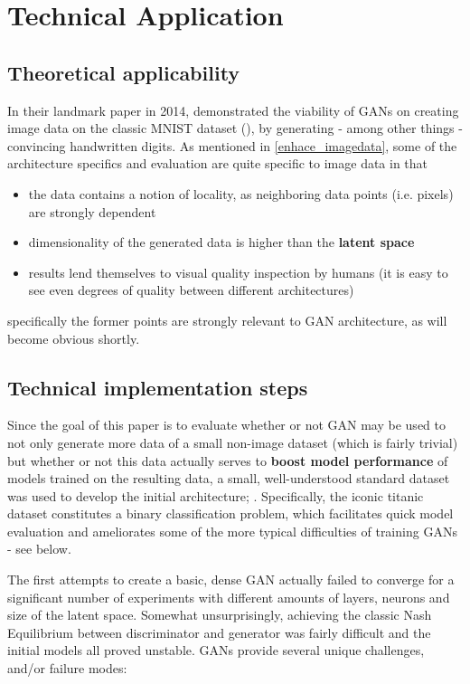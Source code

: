 \chapter{Technical Application}

\section{Theoretical applicability}

In their landmark paper in 2014, \cite{goodfellow2014generative} demonstrated the viability of \acp{GAN} on creating image data on the classic MNIST dataset (\cite{mnist}), by generating - among other things - convincing handwritten digits.
As mentioned in \ref{enhace_imagedata}, some of the architecture specifics and evaluation are quite specific to image data in that 

\begin{itemize}
	\item the data contains a notion of locality, as neighboring data points (i.e. pixels) are strongly dependent
	\item dimensionality of the generated data is higher than the \textbf{latent space} 
	\item results lend themselves to visual quality inspection by humans (it is easy to see even degrees of quality between different architectures)
\end{itemize}

specifically the former points are strongly relevant to \ac{GAN} architecture, as will become obvious shortly.

\section{Technical implementation steps}

Since the goal of this paper is to evaluate whether or not \ac{GAN} may be used to not only generate more data of a small non-image dataset (which is fairly trivial) but whether or not this data actually serves to \textbf{boost model performance} of models trained on the resulting data, a small, well-understood standard dataset was used to develop the initial architecture; \cite{titanic}.
Specifically, the iconic titanic dataset constitutes a binary classification problem, which facilitates quick model evaluation and ameliorates some of the more typical difficulties of training \acp{GAN} - see below.

The first attempts to create a basic, dense \ac{GAN} actually failed to converge for a significant number of experiments with different amounts of layers, neurons and size of the latent space. Somewhat unsurprisingly, achieving the classic Nash Equilibrium between discriminator and generator was fairly difficult and the initial models all proved unstable. \acp{GAN} provide several unique challenges, and/or failure modes:

